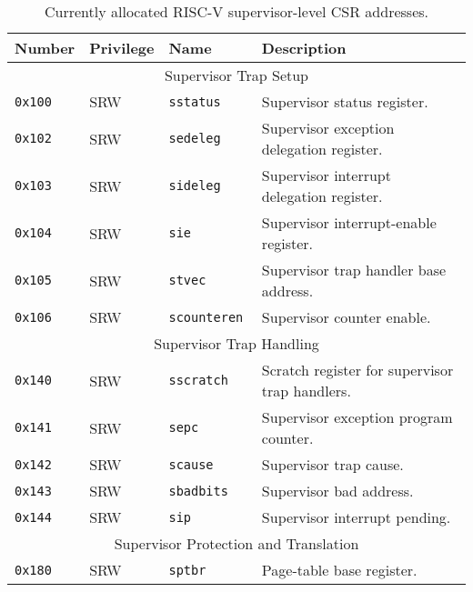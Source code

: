 \begin{table}[htb!]
\begin{center}
\begin{tabular}{|l|l|l|l|}
\hline
Number    & Privilege & Name & Description \\
\hline  
\multicolumn{4}{|c|}{Supervisor Trap Setup} \\
\hline
\tt 0x100 & SRW  &\tt sstatus    & Supervisor status register. \\
\tt 0x102 & SRW  &\tt sedeleg    & Supervisor exception delegation register. \\
\tt 0x103 & SRW  &\tt sideleg    & Supervisor interrupt delegation register. \\
\tt 0x104 & SRW  &\tt sie        & Supervisor interrupt-enable register. \\
\tt 0x105 & SRW  &\tt stvec      & Supervisor trap handler base address. \\
\tt 0x106 & SRW  &\tt scounteren & Supervisor counter enable. \\
\hline
\multicolumn{4}{|c|}{Supervisor Trap Handling} \\
\hline
\tt 0x140 & SRW  &\tt sscratch   & Scratch register for supervisor trap handlers. \\
\tt 0x141 & SRW  &\tt sepc       & Supervisor exception program counter. \\
\tt 0x142 & SRW  &\tt scause     & Supervisor trap cause. \\
\tt 0x143 & SRW  &\tt sbadbits   & Supervisor bad address. \\
\tt 0x144 & SRW  &\tt sip        & Supervisor interrupt pending. \\
\hline
\multicolumn{4}{|c|}{Supervisor Protection and Translation} \\
\hline
\tt 0x180 & SRW  &\tt sptbr      & Page-table base register. \\
\hline
\end{tabular}
\end{center}
\caption{Currently allocated RISC-V supervisor-level CSR addresses.}
\label{scsrnames}
\end{table}


